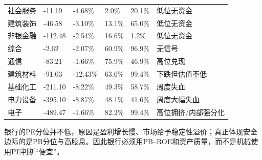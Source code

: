 \begin{longtable}{L{2.2cm}R{1.45cm}R{1.45cm}R{1.35cm}R{1.35cm}L{3.1cm}}
社会服务 & -11.19 & -4.68\% & 2.0\% & 20.1\% & 低位无资金 \\
建筑装饰 & -46.58 & -3.10\% & 13.1\% & 65.0\% & 低位无资金 \\
非银金融 & -112.48 & -2.54\% & 16.6\% & 1.2\% & 低位无资金 \\
综合 & -2.62 & -2.07\% & 60.9\% & 96.9\% & 无信号 \\
通信 & -83.21 & -1.66\% & 75.9\% & 46.9\% & 高位兑现 \\
建筑材料 & -91.03 & -12.43\% & 63.6\% & 99.4\% & 下跌但估值不低 \\
基础化工 & -211.10 & -8.22\% & 49.3\% & 58.7\% & 周度失血 \\
电力设备 & -395.10 & -8.87\% & 48.1\% & 41.6\% & 周度大幅失血 \\
电子 & -489.47 & -1.66\% & 82.2\% & 99.4\% & 高位拥挤/内部强分化 \\
\bottomrule
\end{longtable}
\normalsize

银行的PE分位并不低，原因是盈利增长慢、市场给予稳定性溢价；真正体现安全边际的是PB分位与高股息。因此银行必须用PB--ROE和资产质量，而不是机械使用PE判断“便宜”。
